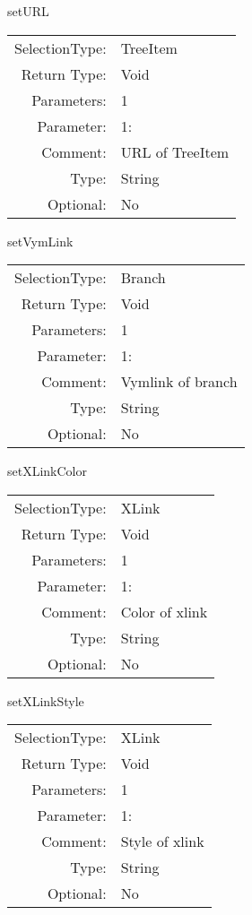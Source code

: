 \item setURL\\
\begin{tabular}{rl}
  SelectionType: & TreeItem\\
    Return Type: & Void\\
     Parameters: & 1\\
   Parameter: &  1:\\
        Comment: & URL of TreeItem\\
           Type: & String\\
       Optional: &  No\\
\end{tabular}

\item setVymLink\\
\begin{tabular}{rl}
  SelectionType: & Branch\\
    Return Type: & Void\\
     Parameters: & 1\\
   Parameter: &  1:\\
        Comment: & Vymlink of branch\\
           Type: & String\\
       Optional: &  No\\
\end{tabular}

\item setXLinkColor\\
\begin{tabular}{rl}
  SelectionType: & XLink\\
    Return Type: & Void\\
     Parameters: & 1\\
   Parameter: &  1:\\
        Comment: & Color of xlink\\
           Type: & String\\
       Optional: &  No\\
\end{tabular}

\item setXLinkStyle\\
\begin{tabular}{rl}
  SelectionType: & XLink\\
    Return Type: & Void\\
     Parameters: & 1\\
   Parameter: &  1:\\
        Comment: & Style of xlink\\
           Type: & String\\
       Optional: &  No\\
\end{tabular}

